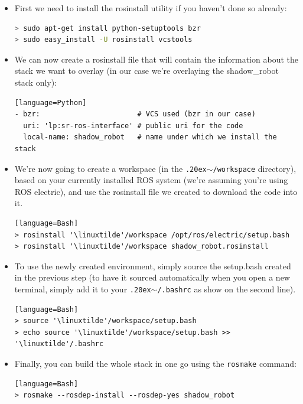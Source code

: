 \documentclass[12pt]{article}
\newcommand{\linuxtilde}{\raise.20ex\hbox{$\scriptstyle\mathtt{\sim}$}}
\begin{document}
\begin{itemize}
\item First we need to install the rosinstall utility if you haven't done so already:
  \begin{lstlisting}[language=Bash]
> sudo apt-get install python-setuptools bzr
> sudo easy_install -U rosinstall vcstools
  \end{lstlisting}

\item We can now create a rosinstall file that will contain the information about the stack we want to overlay (in our case we're overlaying the shadow\_robot stack only):
  \begin{lstlisting}[title={\textbf{shadow\_robot.rosinstall}}][language=Python]
- bzr:                       # VCS used (bzr in our case)
  uri: 'lp:sr-ros-interface' # public uri for the code
  local-name: shadow_robot   # name under which we install the stack
  \end{lstlisting}

\item We're now going to create a workspace (in the \texttt{\linuxtilde/workspace} directory), based on your currently installed ROS system (we're assuming you're using ROS electric), and use the rosinstall file we created to download the code into it.
  \begin{lstlisting}[escapeinside=''][language=Bash]
> rosinstall '\linuxtilde'/workspace /opt/ros/electric/setup.bash
> rosinstall '\linuxtilde'/workspace shadow_robot.rosinstall
  \end{lstlisting}

\item To use the newly created environment, simply source the setup.bash created in the previous step (to have it sourced automatically when you open a new terminal, simply add it to your \texttt{\linuxtilde/.bashrc} as show on the second line).
  \begin{lstlisting}[escapeinside=''][language=Bash]
> source '\linuxtilde'/workspace/setup.bash
> echo source '\linuxtilde'/workspace/setup.bash >> '\linuxtilde'/.bashrc
  \end{lstlisting}

\item Finally, you can build the whole stack in one go using the \texttt{rosmake} command:
  \begin{lstlisting}[escapeinside=''][language=Bash]
> rosmake --rosdep-install --rosdep-yes shadow_robot
  \end{lstlisting}

\end{itemize}
\newpage
\end{document}
